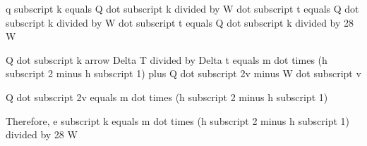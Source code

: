 q subscript k equals Q dot subscript k divided by W dot subscript t equals Q dot subscript k divided by W dot subscript t equals Q dot subscript k divided by 28 W  

Q dot subscript k arrow  
Delta T divided by Delta t equals m dot times (h subscript 2 minus h subscript 1) plus Q dot subscript 2v minus W dot subscript v  

Q dot subscript 2v equals m dot times (h subscript 2 minus h subscript 1)  

Therefore, e subscript k equals m dot times (h subscript 2 minus h subscript 1) divided by 28 W